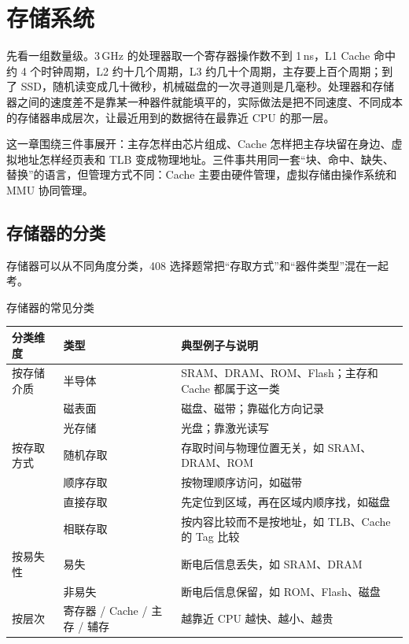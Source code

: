\section{存储系统}

先看一组数量级。3\,GHz 的处理器取一个寄存器操作数不到 1\,ns，L1 Cache 命中约 4 个时钟周期，L2 约十几个周期，L3 约几十个周期，主存要上百个周期；到了 SSD，随机读变成几十微秒，机械磁盘的一次寻道则是几毫秒。处理器和存储器之间的速度差不是靠某一种器件就能填平的，实际做法是把不同速度、不同成本的存储器串成层次，让最近用到的数据待在最靠近 CPU 的那一层。

这一章围绕三件事展开：主存怎样由芯片组成、Cache 怎样把主存块留在身边、虚拟地址怎样经页表和 TLB 变成物理地址。三件事共用同一套“块、命中、缺失、替换”的语言，但管理方式不同：Cache 主要由硬件管理，虚拟存储由操作系统和 MMU 协同管理。

\subsection{存储器的分类}

存储器可以从不同角度分类，408 选择题常把“存取方式”和“器件类型”混在一起考。

\begin{tablebox}{存储器的常见分类}
\centering
\begin{tabularx}{\linewidth}{|p{2.4cm}|p{3.2cm}|>{\raggedright\arraybackslash}X|}
\hline
分类维度 & 类型 & 典型例子与说明 \\
\hline
按存储介质 & 半导体 & SRAM、DRAM、ROM、Flash；主存和 Cache 都属于这一类 \\
 & 磁表面 & 磁盘、磁带；靠磁化方向记录 \\
 & 光存储 & 光盘；靠激光读写 \\
\hline
按存取方式 & 随机存取 & 存取时间与物理位置无关，如 SRAM、DRAM、ROM \\
 & 顺序存取 & 按物理顺序访问，如磁带 \\
 & 直接存取 & 先定位到区域，再在区域内顺序找，如磁盘 \\
 & 相联存取 & 按内容比较而不是按地址，如 TLB、Cache 的 Tag 比较 \\
\hline
按易失性 & 易失 & 断电后信息丢失，如 SRAM、DRAM \\
 & 非易失 & 断电后信息保留，如 ROM、Flash、磁盘 \\
\hline
按层次 & 寄存器 / Cache / 主存 / 辅存 & 越靠近 CPU 越快、越小、越贵 \\
\hline
\end{tabularx}
\end{tablebox}

